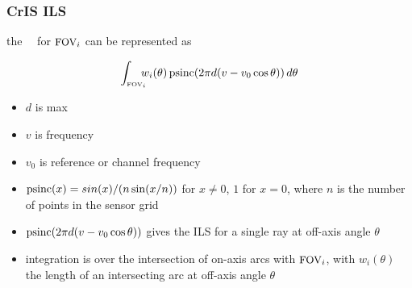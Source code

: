 \documentclass[11pt]{beamer}
\begin{document}
\begin{frame}
\frametitle{CrIS ILS}

the \cris\ \ils\ for $\mbox{\small FOV}_i$ can be represented as

\[\int_{\mbox{\tiny FOV}_i} \!\!\!\! w_i(\theta)\, \mbox{psinc}(2 \pi
                 d(v - v_0 \cos \theta ))\, d\theta \]


\begin{itemize}
  \item $d$ is max \opd
  \item $v$ is frequency
  \item $v_0$ is reference or channel frequency
  \item $\mbox{psinc}(x) = sin(x)/(n \sin(x/n))$ for $x \ne 0$,  $1$ for
    $x = 0$, where $n$ is the number of points in the sensor grid
   \item $\mbox{psinc}(2 \pi d(v - v_0 \cos \theta ))$ gives the ILS for a
    single ray at off-axis angle $\theta$
  \item integration is over the intersection of on-axis arcs with
    $\mbox{\small FOV}_i$, with $w_i(\theta)$ the length of an intersecting arc
    at off-axis angle $\theta$
\end{itemize}

\end{frame}
\end{document}

